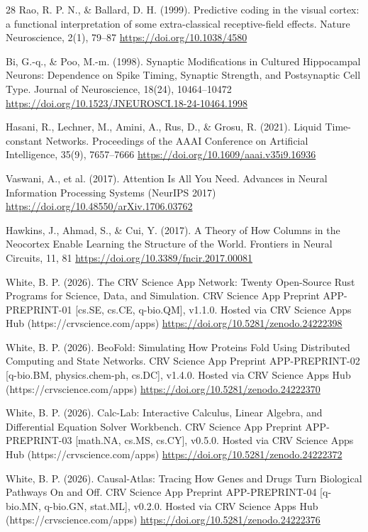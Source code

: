 \documentclass[10pt,letterpaper]{article}
\begin{document}
\begin{thebibliography}{28}
 Rao, R. P. N., \& Ballard, D. H. (1999). Predictive coding in the visual cortex: a functional interpretation of some extra-classical receptive-field effects. Nature Neuroscience, 2(1), 79--87 \url{https://doi.org/10.1038/4580}

 Bi, G.-q., \& Poo, M.-m. (1998). Synaptic Modifications in Cultured Hippocampal Neurons: Dependence on Spike Timing, Synaptic Strength, and Postsynaptic Cell Type. Journal of Neuroscience, 18(24), 10464--10472 \url{https://doi.org/10.1523/JNEUROSCI.18-24-10464.1998}

 Hasani, R., Lechner, M., Amini, A., Rus, D., \& Grosu, R. (2021). Liquid Time-constant Networks. Proceedings of the AAAI Conference on Artificial Intelligence, 35(9), 7657--7666 \url{https://doi.org/10.1609/aaai.v35i9.16936}

 Vaswani, A., et al. (2017). Attention Is All You Need. Advances in Neural Information Processing Systems (NeurIPS 2017) \url{https://doi.org/10.48550/arXiv.1706.03762}

 Hawkins, J., Ahmad, S., \& Cui, Y. (2017). A Theory of How Columns in the Neocortex Enable Learning the Structure of the World. Frontiers in Neural Circuits, 11, 81 \url{https://doi.org/10.3389/fncir.2017.00081}

 White, B. P. (2026). The CRV Science App Network: Twenty Open-Source Rust Programs for Science, Data, and Simulation. CRV Science App Preprint APP-PREPRINT-01 [cs.SE, cs.CE, q-bio.QM], v1.1.0. Hosted via CRV Science Apps Hub (https://crvscience.com/apps) \url{https://doi.org/10.5281/zenodo.24222398}

 White, B. P. (2026). BeoFold: Simulating How Proteins Fold Using Distributed Computing and State Networks. CRV Science App Preprint APP-PREPRINT-02 [q-bio.BM, physics.chem-ph, cs.DC], v1.4.0. Hosted via CRV Science Apps Hub (https://crvscience.com/apps) \url{https://doi.org/10.5281/zenodo.24222370}

 White, B. P. (2026). Calc-Lab: Interactive Calculus, Linear Algebra, and Differential Equation Solver Workbench. CRV Science App Preprint APP-PREPRINT-03 [math.NA, cs.MS, cs.CY], v0.5.0. Hosted via CRV Science Apps Hub (https://crvscience.com/apps) \url{https://doi.org/10.5281/zenodo.24222372}

 White, B. P. (2026). Causal-Atlas: Tracing How Genes and Drugs Turn Biological Pathways On and Off. CRV Science App Preprint APP-PREPRINT-04 [q-bio.MN, q-bio.GN, stat.ML], v0.2.0. Hosted via CRV Science Apps Hub (https://crvscience.com/apps) \url{https://doi.org/10.5281/zenodo.24222376}


\end{thebibliography}
\end{document}
